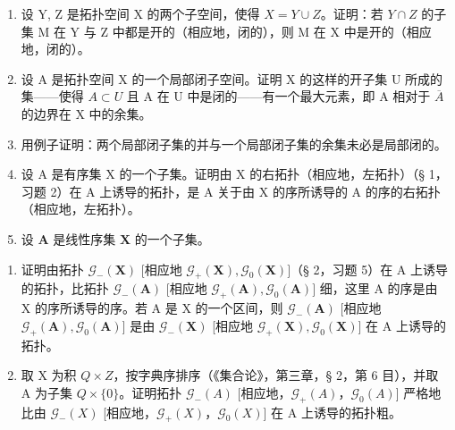 \begin{enumerate}
\def\labelenumi{\arabic{enumi})}
\setcounter{enumi}{4}
\item
  设 Y, Z 是拓扑空间 X 的两个子空间，使得 \(X = Y \cup Z\)。证明：若 \(Y \cap Z\) 的子集 M 在 Y 与 Z 中都是开的（相应地，闭的），则 M 在 X 中是开的（相应地，闭的）。
\item
  设 A 是拓扑空间 X 的一个局部闭子空间。证明 X 的这样的开子集 U 所成的集——使得 \(A \subset U\) 且 A 在 U 中是闭的——有一个最大元素，即 A 相对于 \(\overline{A}\) 的边界在 X 中的余集。
\item
  用例子证明：两个局部闭子集的并与一个局部闭子集的余集未必是局部闭的。
\item
  设 A 是有序集 X 的一个子集。证明由 X 的右拓扑（相应地，左拓扑）（§ 1，习题 2）在 A 上诱导的拓扑，是 A 关于由 X 的序所诱导的 A 的序的右拓扑（相应地，左拓扑）。
\item
  设 \(\mathbf{A}\) 是线性序集 \(\mathbf{X}\) 的一个子集。
\end{enumerate}

\begin{enumerate}
\def\labelenumi{\alph{enumi})}
\item
  证明由拓扑 \(\mathcal{G}_{-}(\mathbf{X})\) {[}相应地 \(\mathcal{G}_{+}(\mathbf{X}),\mathcal{G}_{0}(\mathbf{X})]\)（§ 2，习题 5）在 A 上诱导的拓扑，比拓扑 \(\mathcal{G}_{-}(\mathbf{A})\) {[}相应地 \(\mathcal{G}_{+}(\mathbf{A}),\mathcal{G}_{0}(\mathbf{A})]\) 细，这里 A 的序是由 X 的序所诱导的序。若 A 是 X 的一个区间，则 \(\mathcal{G}_{-}(\mathbf{A})\) {[}相应地 \(\mathcal{G}_{+}(\mathbf{A}),\mathcal{G}_{0}(\mathbf{A})]\) 是由 \(\mathcal{G}_{-}(\mathbf{X})\) {[}相应地 \(\mathcal{G}_{+}(\mathbf{X}),\mathcal{G}_{0}(\mathbf{X})]\) 在 A 上诱导的拓扑。
\item
  取 X 为积 \(Q \times Z\)，按字典序排序（《集合论》，第三章，§ 2，第 6 目），并取 A 为子集 \(Q \times \{0\}\)。证明拓扑 \(\mathcal{G}_{-}(A)\) {[}相应地，\(\mathcal{G}_{+}(A)\)，\(\mathcal{G}_{0}(A)\){]} 严格地比由 \(\mathcal{G}_{-}(X)\) {[}相应地，\(\mathcal{G}_{+}(X)\)，\(\mathcal{G}_{0}(X)\){]} 在 A 上诱导的拓扑粗。
\end{enumerate}

